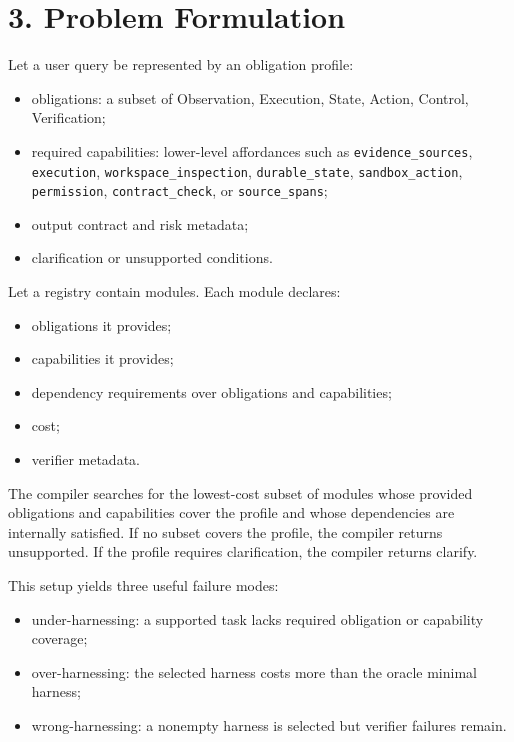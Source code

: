 \documentclass[
  10pt,
]{article}
\providecommand{\tightlist}{%
  \setlength{\itemsep}{0pt}\setlength{\parskip}{0pt}}
\begin{document}
\section{3. Problem Formulation}\label{problem-formulation}

Let a user query be represented by an obligation profile:

\begin{itemize}
\tightlist
\item
  obligations: a subset of Observation, Execution, State, Action,
  Control, Verification;
\item
  required capabilities: lower-level affordances such as
  \texttt{evidence\_sources}, \texttt{execution},
  \texttt{workspace\_inspection}, \texttt{durable\_state},
  \texttt{sandbox\_action}, \texttt{permission},
  \texttt{contract\_check}, or \texttt{source\_spans};
\item
  output contract and risk metadata;
\item
  clarification or unsupported conditions.
\end{itemize}

Let a registry contain modules. Each module declares:

\begin{itemize}
\tightlist
\item
  obligations it provides;
\item
  capabilities it provides;
\item
  dependency requirements over obligations and capabilities;
\item
  cost;
\item
  verifier metadata.
\end{itemize}

The compiler searches for the lowest-cost subset of modules whose
provided obligations and capabilities cover the profile and whose
dependencies are internally satisfied. If no subset covers the profile,
the compiler returns unsupported. If the profile requires clarification,
the compiler returns clarify.

This setup yields three useful failure modes:

\begin{itemize}
\tightlist
\item
  under-harnessing: a supported task lacks required obligation or
  capability coverage;
\item
  over-harnessing: the selected harness costs more than the oracle
  minimal harness;
\item
  wrong-harnessing: a nonempty harness is selected but verifier failures
  remain.
\end{itemize}
\end{document}
